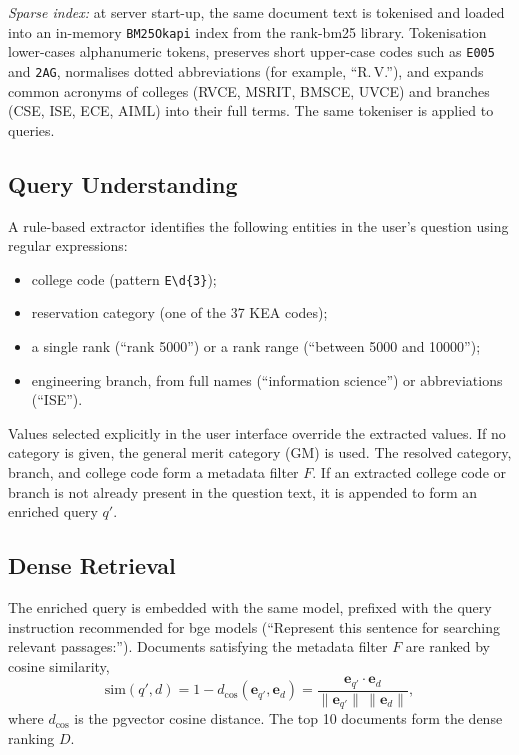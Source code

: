 \documentclass[conference]{IEEEtran}
\begin{document}
\textit{Sparse index:} at server start-up, the same document text
is tokenised and loaded into an in-memory \texttt{BM25Okapi} index
from the rank-bm25 library. Tokenisation lower-cases alphanumeric
tokens, preserves short upper-case codes such as \texttt{E005} and
\texttt{2AG}, normalises dotted abbreviations (for example,
``R.\,V.''), and expands common acronyms of colleges (RVCE, MSRIT,
BMSCE, UVCE) and branches (CSE, ISE, ECE, AIML) into their full
terms. The same tokeniser is applied to queries.

\subsection{Query Understanding}
\label{sec:entity}

A rule-based extractor identifies the following entities
in the user's question using regular expressions:

\begin{itemize}
    \item college code (pattern \texttt{E\textbackslash d\{3\}});
    \item reservation category (one of the 37 KEA codes);
    \item a single rank (``rank 5000'') or a rank range
    (``between 5000 and 10000'');
    \item engineering branch, from full names
    (``information science'') or abbreviations (``ISE'').
\end{itemize}

Values selected explicitly in the user interface override the
extracted values. If no category is given, the general merit
category (GM) is used. The resolved category, branch, and
college code form a metadata filter $F$. If an extracted college
code or branch is not already present in the question text, it is
appended to form an enriched query $q'$.

\subsection{Dense Retrieval}

The enriched query is embedded with the same model, prefixed with
the query instruction recommended for bge models (``Represent this
sentence for searching relevant passages:''). Documents satisfying
the metadata filter $F$ are ranked by cosine similarity,
\begin{equation}
\mathrm{sim}(q', d) = 1 - d_{\cos}(\mathbf{e}_{q'}, \mathbf{e}_d)
= \frac{\mathbf{e}_{q'} \cdot \mathbf{e}_d}
{\lVert \mathbf{e}_{q'} \rVert \, \lVert \mathbf{e}_d \rVert},
\end{equation}
where $d_{\cos}$ is the pgvector cosine distance. The top 10
documents form the dense ranking $D$.
\end{document}
